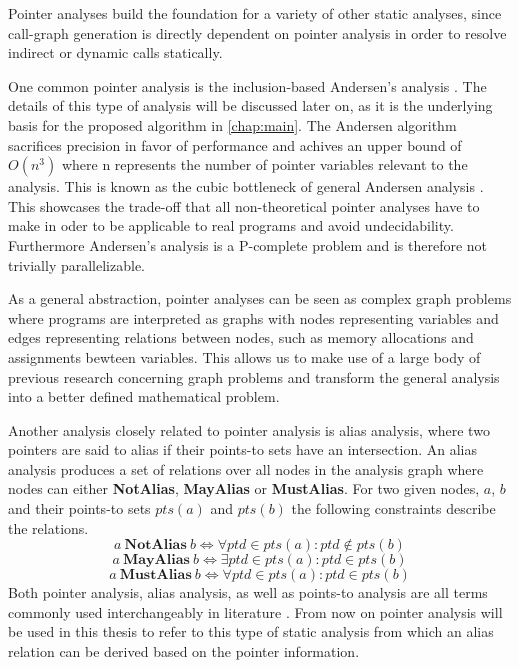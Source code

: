 Pointer analyses build the foundation for a variety of other static analyses, since call-graph generation is directly dependent on pointer analysis in order to resolve indirect or dynamic calls statically.

One common pointer analysis is the inclusion-based Andersen's analysis \cite{andersen1994program}. The details of this type of analysis will be discussed later on, as it is the underlying basis for the proposed algorithm in \autoref{chap:main}. The Andersen algorithm sacrifices precision in favor of performance and achives an upper bound of $O(n^3)$ where n represents the number of pointer variables relevant to the analysis. This is known as the cubic bottleneck of general Andersen analysis \cite{mathiasen2021fine}.
This showcases the trade-off that all non-theoretical pointer analyses have to make in oder to be applicable to real programs and avoid undecidability. Furthermore Andersen's analysis is a P-complete problem and is therefore not trivially parallelizable.

As a general abstraction, pointer analyses can be seen as complex graph problems where programs are interpreted as graphs with nodes representing variables and edges representing relations between nodes, such as memory allocations and assignments bewteen variables.
This allows us to make use of a large body of previous research concerning graph problems and transform the general analysis into a better defined mathematical problem.

Another analysis closely related to pointer analysis is alias analysis, where two pointers are said to alias if their points-to sets have an intersection. An alias analysis produces a set of relations over all nodes in the analysis graph where nodes can either \textbf{NotAlias}, \textbf{MayAlias} or \textbf{MustAlias}.
For two given nodes, $a$, $b$ and their points-to sets $pts(a)$ and $pts(b)$ the following constraints describe the relations.
$$a\ \textbf{NotAlias}\ b \iff \forall ptd \in pts(a) \colon ptd \notin pts(b)$$
$$a\ \textbf{MayAlias}\ b \iff \exists ptd \in pts(a) \colon ptd \in pts(b)$$
$$a\ \textbf{MustAlias}\ b \iff \forall ptd \in pts(a) \colon ptd \in pts(b)$$
Both pointer analysis, alias analysis, as well as points-to analysis are all terms commonly used interchangeably in literature \cite{hind2001pointer}. From now on pointer analysis will be used in this thesis to refer to this type of static analysis from which an alias relation can be derived based on the pointer information.

